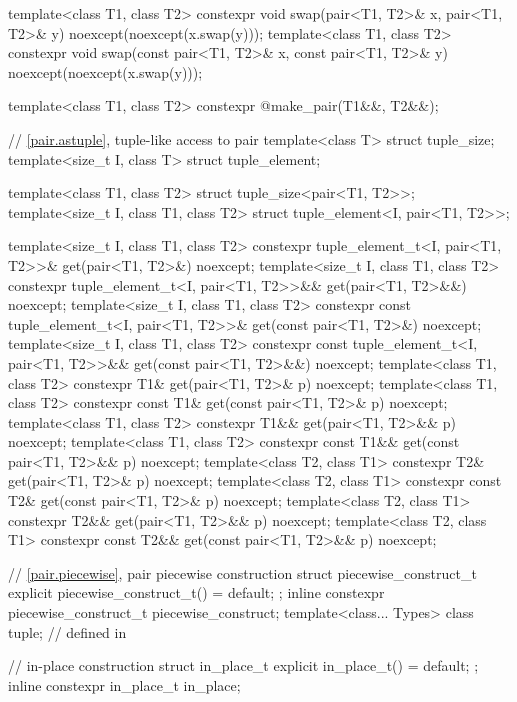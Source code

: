 \begin{codeblock}
{  template<class T1, class T2>
    constexpr void swap(pair<T1, T2>& x, pair<T1, T2>& y) noexcept(noexcept(x.swap(y)));
  template<class T1, class T2>
    constexpr void swap(const pair<T1, T2>& x, const pair<T1, T2>& y)
      noexcept(noexcept(x.swap(y)));

  template<class T1, class T2>
    constexpr @\seebelow@ make_pair(T1&&, T2&&);

  // \ref{pair.astuple}, tuple-like access to pair
  template<class T> struct tuple_size;
  template<size_t I, class T> struct tuple_element;

  template<class T1, class T2> struct tuple_size<pair<T1, T2>>;
  template<size_t I, class T1, class T2> struct tuple_element<I, pair<T1, T2>>;

  template<size_t I, class T1, class T2>
    constexpr tuple_element_t<I, pair<T1, T2>>& get(pair<T1, T2>&) noexcept;
  template<size_t I, class T1, class T2>
    constexpr tuple_element_t<I, pair<T1, T2>>&& get(pair<T1, T2>&&) noexcept;
  template<size_t I, class T1, class T2>
    constexpr const tuple_element_t<I, pair<T1, T2>>& get(const pair<T1, T2>&) noexcept;
  template<size_t I, class T1, class T2>
    constexpr const tuple_element_t<I, pair<T1, T2>>&& get(const pair<T1, T2>&&) noexcept;
  template<class T1, class T2>
    constexpr T1& get(pair<T1, T2>& p) noexcept;
  template<class T1, class T2>
    constexpr const T1& get(const pair<T1, T2>& p) noexcept;
  template<class T1, class T2>
    constexpr T1&& get(pair<T1, T2>&& p) noexcept;
  template<class T1, class T2>
    constexpr const T1&& get(const pair<T1, T2>&& p) noexcept;
  template<class T2, class T1>
    constexpr T2& get(pair<T1, T2>& p) noexcept;
  template<class T2, class T1>
    constexpr const T2& get(const pair<T1, T2>& p) noexcept;
  template<class T2, class T1>
    constexpr T2&& get(pair<T1, T2>&& p) noexcept;
  template<class T2, class T1>
    constexpr const T2&& get(const pair<T1, T2>&& p) noexcept;

  // \ref{pair.piecewise}, pair piecewise construction
  struct piecewise_construct_t {
    explicit piecewise_construct_t() = default;
  };
  inline constexpr piecewise_construct_t piecewise_construct{};
  template<class... Types> class tuple;         // defined in 

  // in-place construction%
%
%
%
%
%
  struct in_place_t {
    explicit in_place_t() = default;
  };
  inline constexpr in_place_t in_place{};

}
\end{codeblock}
